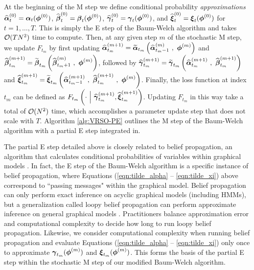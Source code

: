 At the beginning of the M step we define conditional probability \textit{approximations} $\widehat {\boldsymbol{\alpha}}_{t}^{(0)} = \boldsymbol{\alpha}_t(\boldsymbol{\phi}^{(0)})$, $\widehat {\boldsymbol{\beta}}_{t}^{(0)} = \boldsymbol{\beta}_t(\boldsymbol{\phi}^{(0)})$, $\widehat {\boldsymbol{\gamma}}_{t}^{(0)} = \boldsymbol{\gamma}_t(\boldsymbol{\phi}^{(0)})$, and $\widehat {\boldsymbol{\xi}}_{t}^{(0)} = \boldsymbol{\xi}_t(\boldsymbol{\phi}^{(0)})$ for $t = 1,\ldots,T$. This is simply the E step of the Baum-Welch algorithm and takes $\mathcal{O}(TN^2)$ time to compute. Then, at any given step $m$ of the stochastic M step, we update $F_{t_m}$ by first updating $\widehat {\boldsymbol{\alpha}}_{t_m}^{(m+1)} = \widetilde {\boldsymbol{\alpha}}_{t_m}\left(\widehat {\boldsymbol{\alpha}}_{t_m-1}^{(m)} ~,~ \boldsymbol{\phi}^{(m)}\right)$ and $\widehat {\boldsymbol{\beta}}_{t_m}^{(m+1)} = \widetilde {\boldsymbol{\beta}}_{t_m}\left(\widehat {\boldsymbol{\beta}}_{t_m+1}^{(m)} ~,~ \boldsymbol{\phi}^{(m)}\right)$, followed by $\widehat {\boldsymbol{\gamma}}_{t_m}^{(m+1)} = \widetilde {\boldsymbol{\gamma}}_{t_m}\left(\widehat {\boldsymbol{\alpha}}_{t_m}^{(m+1)} ~,~ \widehat {\boldsymbol{\beta}}_{t_m}^{(m+1)}\right)$ and $\widehat {\boldsymbol{\xi}}_{t_m}^{(m+1)} = \widetilde {\boldsymbol{\xi}}_{t_m}\left(\widehat {\boldsymbol{\alpha}}_{t_m-1}^{(m+1)} ~,~ \widehat {\boldsymbol{\beta}}_{t_m}^{(m+1)} ~,~ \boldsymbol{\phi}^{(m)}\right)$. Finally, the loss function at index $t_m$ can be defined as $F_{t_m}\left(\cdot ~ \Big | ~ \widehat {\boldsymbol{\gamma}}_{t_m}^{(m+1)},\widehat {\boldsymbol{\xi}}_{t_m}^{(m+1)}\right)$. Updating $F_{t_m}$ in this way take a total of $\mathcal{O}(N^2)$ time, which accomplishes a parameter update step that does not scale with $T$. Algorithm \ref{alg:VRSO-PE} outlines the M step of the Baum-Welch algorithm with a partial E step integrated in. 

The partial E step detailed above is closely related to belief propagation, an algorithm that calculates conditional probabilities of variables within graphical models \citep{Pearl:1982}. In fact, the E step of the Baum-Welch algorithm is a specific instance of belief propagation, where Equations (\ref{eqn:tilde_alpha} -- \ref{eqn:tilde_xi}) above correspond to ``passing messages" within the graphical model. Belief propagation can only perform exact inference on acyclic graphical models (including HMMs), but a generalization called loopy belief propagation can perform approximate inference on general graphical models \citep{Pearl:1988}. Practitioners balance approximation error and computational complexity to decide how long to run loopy belief propagation. Likewise, we consider computational complexity when running belief propagation and evaluate Equations (\ref{eqn:tilde_alpha} -- \ref{eqn:tilde_xi}) only once to approximate $\boldsymbol{\gamma}_{t_m}(\boldsymbol{\phi}^{(m)})$ and $\boldsymbol{\xi}_{t_m}(\boldsymbol{\phi}^{(m)})$. This forms the basis of the partial E step within the stochastic M step of our modified Baum-Welch algorithm.

